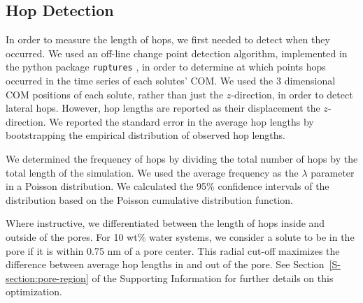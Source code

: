 \documentclass[journal=jpcbfk,manuscript=article]{achemso}
\begin{document}

  \subsection{Hop Detection}\label{method:hop_detection}
  
  In order to measure the length of hops, we first needed to detect
  when they occurred. We used an off-line change point detection 
  algorithm, implemented in the python package \texttt{ruptures}
  \cite{truong_ruptures:_2018}, in order to determine at which 
  points hops occurred in the time series of each solutes' COM. We
  used the 3 dimensional COM positions of each solute, rather than
  just the $z$-direction, in order to detect lateral hops. However,
  hop lengths are reported as their displacement the $z$-direction.
  We reported the standard error in the average hop lengths by 
  bootstrapping the 
  empirical distribution of observed
  hop lengths.

  We determined the frequency of hops by dividing the total number of 
  hops by the total length of the simulation. We used the average
  frequency as the $\lambda$ parameter in a Poisson distribution. We
  calculated the 95\% confidence intervals of the distribution based
  on the Poisson cumulative distribution function. 
 
  
  Where instructive, we differentiated between the length of hops inside
  and outside of the pores. For 10 wt\% water systems, we consider a solute
  to be in the pore if it is within 0.75 nm of a pore center. This radial
  cut-off maximizes the difference between average hop lengths in and out
  of the pore. See Section~\ref{S-section:pore-region} of the Supporting
  Information for further details on this optimization.
  
\end{document}
